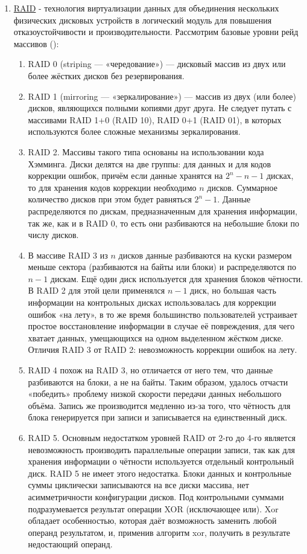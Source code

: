 \begin{enumerate}
     \item \underline{RAID} - технология виртуализации данных для объединения нескольких физических дисковых устройств в логический модуль для повышения отказоустойчивости и производительности.
     Рассмотрим базовые уровни рейд массивов (\autocite{Patterson}):
     \begin{enumerate}
         \item RAID 0 (striping — «чередование») — дисковый массив из двух или более жёстких дисков без резервирования.
         \item RAID 1 (mirroring — «зеркалирование») — массив из двух (или более) дисков, являющихся полными копиями друг друга. Не следует путать с массивами RAID 1+0 (RAID 10), RAID 0+1 (RAID 01), в которых используются более сложные механизмы зеркалирования.
         \item RAID 2. Массивы такого типа основаны на использовании кода Хэмминга. Диски делятся на две группы: для данных и для кодов коррекции ошибок, причём если данные хранятся на $2 ^ n - n - 1$ дисках, то для хранения кодов коррекции необходимо $n$ дисков. Суммарное количество дисков при этом будет равняться $2 ^ n - 1$. Данные распределяются по дискам, предназначенным для хранения информации, так же, как и в RAID 0, то есть они разбиваются на небольшие блоки по числу дисков. 
         \item В массиве RAID 3 из $n$ дисков данные разбиваются на куски размером меньше сектора (разбиваются на байты или блоки) и распределяются по $n - 1$ дискам. Ещё один диск используется для хранения блоков чётности. В RAID 2 для этой цели применялся $n - 1$ диск, но большая часть информации на контрольных дисках использовалась для коррекции ошибок «на лету», в то же время большинство пользователей устраивает простое восстановление информации в случае её повреждения, для чего хватает данных, умещающихся на одном выделенном жёстком диске. \\ Отличия RAID 3 от RAID 2: невозможность коррекции ошибок на лету.
         \item RAID 4 похож на RAID 3, но отличается от него тем, что данные разбиваются на блоки, а не на байты. Таким образом, удалось отчасти «победить» проблему низкой скорости передачи данных небольшого объёма. Запись же производится медленно из-за того, что чётность для блока генерируется при записи и записывается на единственный диск.
         \item RAID 5. Основным недостатком уровней RAID от 2-го до 4-го является невозможность производить параллельные операции записи, так как для хранения информации о чётности используется отдельный контрольный диск. RAID 5 не имеет этого недостатка. Блоки данных и контрольные суммы циклически записываются на все диски массива, нет асимметричности конфигурации дисков. Под контрольными суммами подразумевается результат операции XOR (исключающее или). Xor обладает особенностью, которая даёт возможность заменить любой операнд результатом, и, применив алгоритм xor, получить в результате недостающий операнд.

\end{enumerate}
\end{enumerate}
